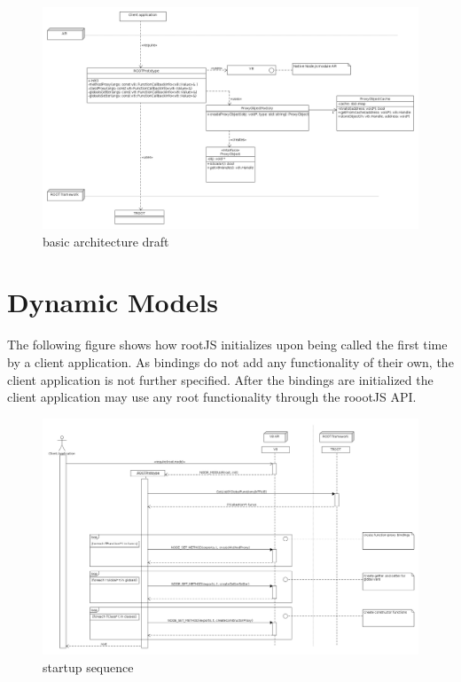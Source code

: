 \begin{figure}[htb]
	\centering
	\includegraphics[width=18cm]{./latex/resources/architecture.png}
	\caption{basic architecture draft}
\end{figure}

\pagebreak[4]

\section{Dynamic Models}
The following figure shows how rootJS initializes upon being called the first time by a client application. As bindings do not add any functionality of their own, the client application is not further specified. After the bindings are initialized the client application may use any root functionality through the roootJS API.
\begin{figure}[htb]
	\centering
	\includegraphics[width=18cm]{./latex/resources/startupSequence.png}
	\caption{startup sequence}
\end{figure}
